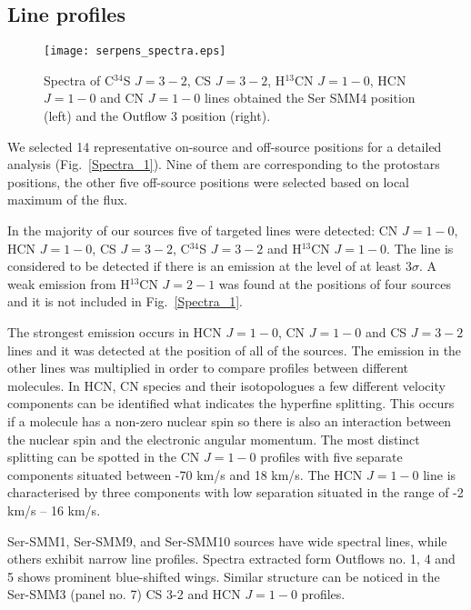 \documentclass{aa}
\begin{document}
\subsection{Line profiles}

\begin{figure*}	
  \texttt{[image: serpens\_spectra.eps]}
\caption{Spectra of C$^{34}$S $J=3-2$, CS $J=3-2$, H$^{13}$CN $J=1-0$, HCN $J=1-0$ and CN $J=1-0$ lines obtained the Ser SMM4 position (left) and the Outflow 3 position (right).}
\label{spectra}
\end{figure*}

We selected 14 representative on-source and off-source positions for a detailed analysis (Fig.~\ref{Spectra_1}). Nine of them are corresponding to the protostars positions, the other five off-source positions were selected based on local maximum of the flux.   

In the majority of our sources five of targeted lines were detected: CN $J=1-0$, HCN $J=1-0$, CS $J=3-2$, C$^{34}$S $J=3-2$ and H$^{13}$CN $J=1-0$. The line is considered to be detected if there is an emission at the level of at least 3$\sigma$. A weak emission from H$^{13}$CN $J=2-1$ was found at the positions of four sources and it is not included in Fig.~\ref{Spectra_1}. 

The strongest emission occurs in HCN $J=1-0$, CN $J=1-0$ and CS $J=3-2$ lines and it was detected at the position of all of the sources. The emission in the other lines was multiplied in order to compare profiles between different molecules. In HCN, CN species and their isotopologues a few different velocity components can be identified what indicates the hyperfine splitting. This occurs if a molecule has a non-zero nuclear spin so there is also an interaction between the nuclear spin and the electronic angular momentum. The most distinct splitting can be spotted in the CN $J=1-0$ profiles with five separate components situated between -70 km/s and 18 km/s. The HCN $J=1-0$ line is characterised by three components with low separation situated in the range of -2 km/s – 16 km/s. 

Ser-SMM1, Ser-SMM9, and Ser-SMM10 sources have wide spectral lines, while others exhibit narrow line profiles. Spectra extracted form Outflows no. 1, 4 and 5 shows prominent blue-shifted wings. Similar structure can be noticed in the Ser-SMM3 (panel no. 7) CS 3-2 and HCN $J=1-0$ profiles. 
\end{document}
